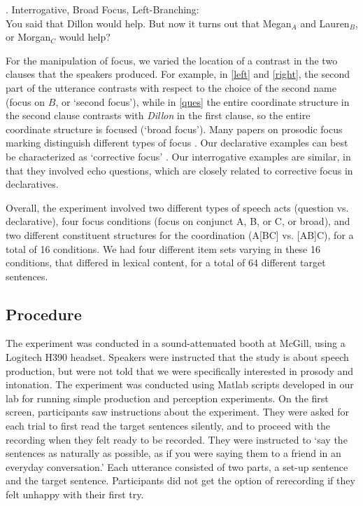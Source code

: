 \documentclass[preprint,review,12pt,authoryear,times]{elsarticle}
\begin{document}
 \ex. Interrogative, Broad Focus, Left-Branching:\\
 {\footnotesize You said that Dillon would help. But now it turns out that Megan$_A$ and Lauren$_B$, or Morgan$_C$ would help?}\label{ques}
 
For the manipulation of focus, we varied the location of a contrast in the two clauses that the speakers produced.  For example, in \ref{left} and \ref{right}, the second part of the utterance contrasts with respect to the choice of the second name (focus on $B$, or `second focus'), while in \ref{ques} the entire coordinate structure in the second clause contrasts with {\em Dillon} in the first clause, so the entire coordinate structure is focused (`broad focus'). Many papers on prosodic focus marking distinguish different types of focus \citep[e.g.][]{gusse07}. Our declarative examples can best be characterized as `corrective focus' \citep[cf.][]{ladd08, vanderkloketal18}. Our interrogative examples are similar, in that they involved echo questions, which are closely related to corrective focus in declaratives.

Overall, the experiment involved two different types of speech acts (question vs. declarative), four focus conditions (focus on conjunct A, B, or C, or  broad), and two different constituent structures for the coordination (A[BC] vs. [AB]C), for a total of 16 conditions. We had four different item sets varying in these 16 conditions, that differed in lexical content, for a total of 64 different target sentences.


\subsection{Procedure}
The experiment was conducted in a sound-attenuated booth at McGill, using a Logitech H390 headset. Speakers were instructed that the study is about speech production, but were not told that we were specifically interested in prosody and intonation. The experiment was conducted using Matlab scripts developed in our lab for running simple production and perception experiments. On the first screen, participants saw instructions about the experiment. They were asked for each trial to  first read the target sentences silently, and to proceed with the recording when they felt ready to be recorded.  They were instructed to `say the sentences as naturally as possible, as if you were saying them to a friend in an everyday conversation.' Each utterance consisted of two parts, a set-up sentence and the target sentence. Participants did not get the option of rerecording if they felt unhappy with their first try.
\end{document}
